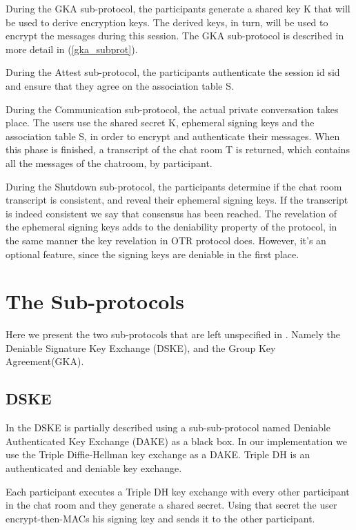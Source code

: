 \documentclass[]{article}
\begin{document}
During the GKA sub-protocol, the participants generate a shared key K that will be used to derive encryption keys.
The derived keys, in turn, will be used to encrypt the messages during this session.
The GKA sub-protocol is described in more detail in (\ref{gka_subprot}).

During the Attest sub-protocol, the participants authenticate the session id sid and ensure that they agree on the association table S.

During the Communication sub-protocol, the actual private conversation takes place.
The users use the shared secret K, ephemeral signing keys and the association table S, in order to encrypt and authenticate their messages.
When this phase is finished, a transcript of the chat room T is returned, which contains all the messages of the chatroom, by participant.

During the Shutdown sub-protocol, the participants determine if the chat room transcript is consistent, and reveal their ephemeral signing keys.
If the transcript is indeed consistent we say that consensus has been reached.
The revelation of the ephemeral signing keys adds to the deniability property of the protocol, in the same manner the key revelation in OTR protocol does.
However, it's an optional feature, since the signing keys are deniable in the first place.

\section{The Sub-protocols}

Here we present the two sub-protocols that are left unspecified in \cite{mpotr}.
Namely the Deniable Signature Key Exchange (DSKE), and the Group Key Agreement(GKA).

\subsection{DSKE}
\label{dske_subprot}

In \cite{mpotr} the DSKE is partially described using a sub-sub-protocol named Deniable Authenticated Key Exchange (DAKE) as a black box.
In our implementation we use the Triple Diffie-Hellman key exchange as a DAKE.
Triple DH is an authenticated and deniable key exchange.

Each participant executes a Triple DH key exchange with every other participant in the chat room and they generate a shared secret.
Using that secret the user encrypt-then-MACs his signing key and sends it to the other participant.
\end{document}
